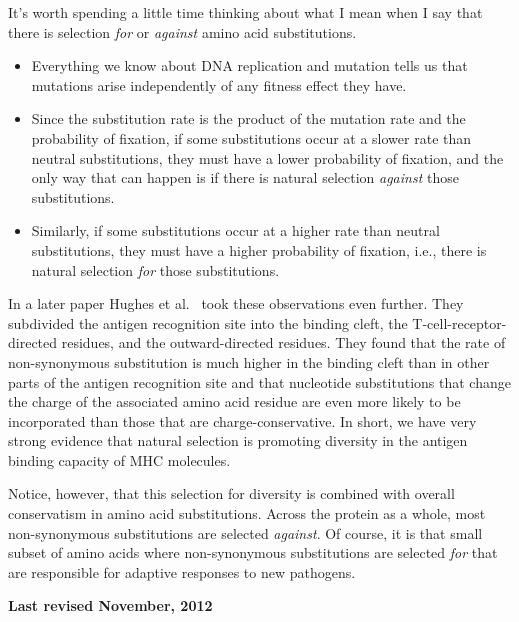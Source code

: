 \noindent It's worth spending a little time thinking about what I mean
when I say that there is selection {\it for\/} or {\it against\/}
amino acid substitutions.

\begin{itemize}

\item Everything we know about DNA replication and mutation tells us
  that mutations arise independently of any fitness effect they
  have.

\item Since the substitution rate is the product of the mutation rate
  and the probability of fixation, if some substitutions occur at a
  slower rate than neutral substitutions, they must have a lower
  probability of fixation, and the only way that can happen is if
  there is natural selection {\it against\/} those substitutions.

\item Similarly, if some substitutions occur at a higher rate than
  neutral substitutions, they must have a higher probability of
  fixation, i.e., there is natural selection {\it for\/} those
  substitutions. 

\end{itemize}

In a later paper Hughes et al.~\cite{Hughes-etal90} took these
observations even further. They subdivided the antigen recognition
site into the binding cleft, the T-cell-receptor-directed residues,
and the outward-directed residues. They found that the rate of
non-synonymous substitution is much higher in the binding cleft than
in other parts of the antigen recognition site and that nucleotide 
substitutions that change the charge of the associated amino acid
residue are even more likely to be incorporated than those that are
charge-conservative. In short, we have very strong evidence that
natural selection is promoting diversity in the antigen binding
capacity of MHC molecules.

Notice, however, that this selection for diversity is combined with
overall conservatism in amino acid substitutions. Across the protein
as a whole, most non-synonymous substitutions are selected {\it
against}. Of course, it is that small subset of amino acids where
non-synonymous substitutions are selected {\it for} that are
responsible for adaptive responses to new pathogens.

{\bf Last revised November, 2012}